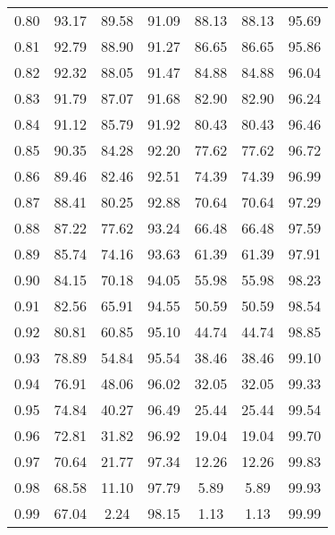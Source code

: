 \begin{tabular}{|c|c|c|c|c|c|c|}
      0.80 &     93.17 &     89.58 &      91.09 &   88.13 &      88.13 &         95.69 \\
      0.81 &     92.79 &     88.90 &      91.27 &   86.65 &      86.65 &         95.86 \\
      0.82 &     92.32 &     88.05 &      91.47 &   84.88 &      84.88 &         96.04 \\
      0.83 &     91.79 &     87.07 &      91.68 &   82.90 &      82.90 &         96.24 \\
      0.84 &     91.12 &     85.79 &      91.92 &   80.43 &      80.43 &         96.46 \\
      0.85 &     90.35 &     84.28 &      92.20 &   77.62 &      77.62 &         96.72 \\
      0.86 &     89.46 &     82.46 &      92.51 &   74.39 &      74.39 &         96.99 \\
      0.87 &     88.41 &     80.25 &      92.88 &   70.64 &      70.64 &         97.29 \\
      0.88 &     87.22 &     77.62 &      93.24 &   66.48 &      66.48 &         97.59 \\
      0.89 &     85.74 &     74.16 &      93.63 &   61.39 &      61.39 &         97.91 \\
      0.90 &     84.15 &     70.18 &      94.05 &   55.98 &      55.98 &         98.23 \\
      0.91 &     82.56 &     65.91 &      94.55 &   50.59 &      50.59 &         98.54 \\
      0.92 &     80.81 &     60.85 &      95.10 &   44.74 &      44.74 &         98.85 \\
      0.93 &     78.89 &     54.84 &      95.54 &   38.46 &      38.46 &         99.10 \\
      0.94 &     76.91 &     48.06 &      96.02 &   32.05 &      32.05 &         99.33 \\
      0.95 &     74.84 &     40.27 &      96.49 &   25.44 &      25.44 &         99.54 \\
      0.96 &     72.81 &     31.82 &      96.92 &   19.04 &      19.04 &         99.70 \\
      0.97 &     70.64 &     21.77 &      97.34 &   12.26 &      12.26 &         99.83 \\
      0.98 &     68.58 &     11.10 &      97.79 &    5.89 &       5.89 &         99.93 \\
      0.99 &     67.04 &      2.24 &      98.15 &    1.13 &       1.13 &         99.99 \\
\bottomrule
\end{tabular}
